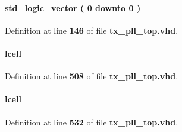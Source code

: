 \paragraph[{inst5\+\_\+dataout}]{ {\bfseries \textcolor{comment}{std\+\_\+logic\+\_\+vector}\textcolor{vhdlchar}{ }\textcolor{vhdlchar}{(}\textcolor{vhdlchar}{ }\textcolor{vhdlchar}{ } \textcolor{vhdldigit}{0} \textcolor{vhdlchar}{ }\textcolor{keywordflow}{downto}\textcolor{vhdlchar}{ }\textcolor{vhdlchar}{ } \textcolor{vhdldigit}{0} \textcolor{vhdlchar}{ }\textcolor{vhdlchar}{)}\textcolor{vhdlchar}{ }} \hspace{0.3cm}{\ttfamily [Signal]}}\label{classtx__pll__top_1_1arch_a9e0494c1f938d777cb9a5e2c4c83b9b1}


Definition at line {\bf 146} of file {\bf tx\+\_\+pll\+\_\+top.\+vhd}.

\paragraph[{lcell0}]{ {\bfseries \textcolor{vhdlchar}{lcell}\textcolor{vhdlchar}{ }} \hspace{0.3cm}{\ttfamily [Instantiation]}}\label{classtx__pll__top_1_1arch_a8edbd2f53cc1b21b1cc1cfea81ac5721}


Definition at line {\bf 508} of file {\bf tx\+\_\+pll\+\_\+top.\+vhd}.

\paragraph[{lcell0}]{ {\bfseries \textcolor{vhdlchar}{lcell}\textcolor{vhdlchar}{ }} \hspace{0.3cm}{\ttfamily [Instantiation]}}\label{classtx__pll__top_1_1arch_a8edbd2f53cc1b21b1cc1cfea81ac5721}


Definition at line {\bf 532} of file {\bf tx\+\_\+pll\+\_\+top.\+vhd}.


